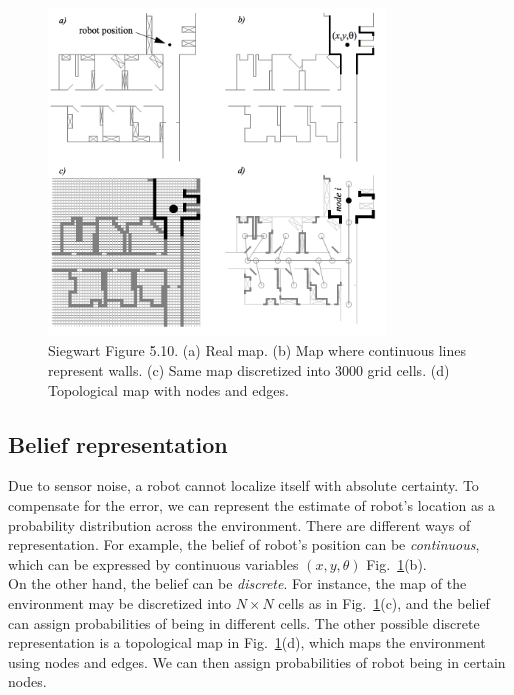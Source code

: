 \documentclass[twoside]{article}
\begin{document}
\begin{figure}[h!]
	\centering
    \includegraphics[width=0.8\textwidth]{img/Siegwart_maps.png}
    \caption{Siegwart Figure 5.10. (a) Real map. (b) Map where continuous lines represent walls. (c) Same map discretized into 3000 grid cells. (d) Topological map with nodes and edges.}
    \label{fig:siegwart_maps}
\end{figure}

\subsection{Belief representation}
Due to sensor noise, a robot cannot localize itself with absolute certainty. To compensate for the error, we can represent the estimate of robot's location as a probability distribution across the environment. There are different ways of representation. For example, the belief of robot's position can be \emph{continuous}, which can be expressed by continuous variables $(x, y, \theta)$ Fig.~\ref{fig:siegwart_maps}(b). \\

On the other hand, the belief can be \emph{discrete}. For instance, the map of the environment may be discretized into $N \times N$ cells as in Fig.~\ref{fig:siegwart_maps}(c), and the belief can assign probabilities of being in different cells. The other possible discrete representation is a topological map in Fig.~\ref{fig:siegwart_maps}(d), which maps the environment using nodes and edges. We can then assign probabilities of robot being in certain nodes. \\
\end{document}

